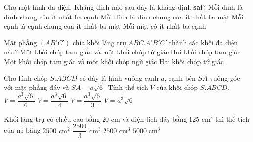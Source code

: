 	\begin{ex}%
		Cho một hình đa diện. Khẳng định nào sau đây là khẳng định \textbf{sai}?
		\choice
		{Mỗi đỉnh là đỉnh chung của ít nhất ba cạnh}
		{Mỗi đỉnh là đỉnh chung của ít nhất ba mặt}
		{\True Mỗi cạnh là cạnh chung của ít nhất ba mặt}
		{Mỗi mặt có ít nhất ba cạnh}
	\end{ex}
	\begin{ex}%
		Mặt phẳng $(AB'C')$ chia khối lăng trụ $ABC.A'B'C'$ thành các khối đa diện nào?	
		\choice
		{\True Một khối chóp tam giác và một khối chóp tứ giác}
		{Hai khối chóp tam giác}
		{Một khối chóp tam giác và một khối chóp ngũ giác}
		{Hai khối chóp tứ giác}
	\end{ex}
	\begin{ex}%
		Cho hình chóp $S.ABCD$ có đáy là hình vuông cạnh $a$, cạnh bên $SA$ vuông góc với mặt phẳng đáy và $SA=a\sqrt{6}$. Tính thể tích $V$ của khối chóp $S.ABCD$.
		\choice
		{$V=\dfrac{a^3\sqrt{6}}{6}$}
		{$V=\dfrac{a^3\sqrt{6}}{4}$}
		{\True $V=\dfrac{a^3\sqrt{6}}{3}$}
		{$V=a^3\sqrt{6}$}
	\end{ex}
	\begin{ex}%
		Khối lăng trụ có chiều cao bằng $20$ cm và diện tích đáy bằng $125$ cm$^2$ thì thể tích của nó bằng
		\choice
		{$2500$ cm$^2$}
		{$\dfrac{2500}{3}$ cm$^3$}
		{\True $2500$ cm$^3$}
		{$5000$ cm$^3$}
	\end{ex}

